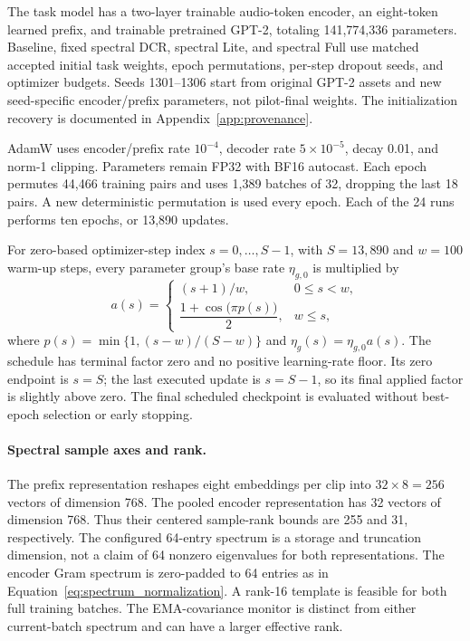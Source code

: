 \documentclass[10pt,a4paper,twocolumn]{article}
\begin{document}
The task model has a two-layer trainable audio-token encoder,
an eight-token learned prefix, and trainable pretrained GPT-2,
totaling 141,774,336 parameters.
Baseline, fixed spectral DCR, spectral Lite, and spectral Full
use matched accepted initial task weights, epoch permutations,
per-step dropout seeds, and optimizer budgets.
Seeds 1301--1306 start from original GPT-2 assets and new
seed-specific encoder/prefix parameters, not pilot-final weights.
The initialization recovery is documented in
Appendix~\ref{app:provenance}.

AdamW uses encoder/prefix rate $10^{-4}$, decoder rate
$5\times10^{-5}$, decay 0.01, and norm-1 clipping.
Parameters remain FP32 with BF16 autocast.
Each epoch permutes 44,466 training pairs and uses
1,389 batches of 32, dropping the last 18 pairs.
A new deterministic permutation is used every epoch.
Each of the 24 runs performs ten epochs, or 13,890 updates.

For zero-based optimizer-step index $s=0,\ldots,S-1$, with
$S=13{,}890$ and $w=100$ warm-up steps, every parameter group's
base rate $\eta_{g,0}$ is multiplied by
\begin{equation}
 a(s)=
 \begin{cases}
 (s+1)/w, & 0\le s<w,\\[2pt]
 \dfrac{1+\cos\!\bigl(\pi p(s)\bigr)}{2}, & w\le s,
 \end{cases}
 \label{eq:audio_lr_schedule}
\end{equation}
where $p(s)=\min\{1,(s-w)/(S-w)\}$ and
$\eta_g(s)=\eta_{g,0}a(s)$.
The schedule has terminal factor zero and no positive learning-rate
floor. Its zero endpoint is $s=S$; the last executed update is
$s=S-1$, so its final applied factor is slightly above zero.
The final scheduled checkpoint is evaluated without best-epoch
selection or early stopping.

\paragraph{Spectral sample axes and rank.}
The prefix representation reshapes eight embeddings per clip
into $32\times8=256$ vectors of dimension 768.
The pooled encoder representation has 32 vectors of dimension 768.
Thus their centered sample-rank bounds are 255 and 31,
respectively. The configured 64-entry spectrum is a storage
and truncation dimension, not a claim of 64 nonzero eigenvalues
for both representations. The encoder Gram spectrum is
zero-padded to 64 entries as in
Equation~\eqref{eq:spectrum_normalization}.
A rank-16 template is feasible for both full training batches.
The EMA-covariance monitor is distinct from either current-batch
spectrum and can have a larger effective rank.
\end{document}
